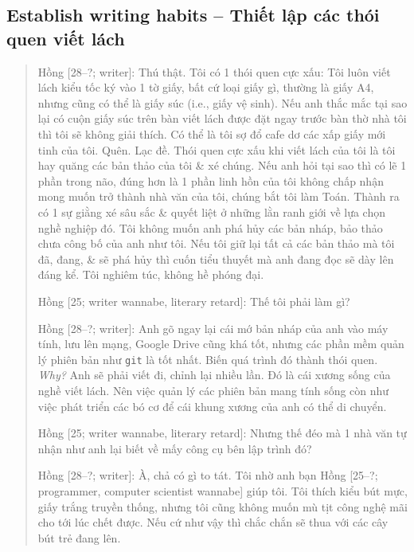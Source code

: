 \documentclass[12pt,twoside]{book}
\begin{document}
\subsection{Establish writing habits -- Thiết lập các thói quen viết lách}

\begin{quote}
	{\sf Hồng [28--?; writer]}: Thú thật. Tôi có 1 thói quen cực xấu: Tôi luôn viết lách kiểu tốc ký vào 1 tờ giấy, bất cứ loại giấy gì, thường là giấy A4, nhưng cũng có thể là giấy súc (i.e., giấy vệ sinh). Nếu anh thắc mắc tại sao lại có cuộn giấy súc trên bàn viết lách được đặt ngay trước bàn thờ nhà tôi thì tôi sẽ không giải thích. Có thể là tôi sợ đổ cafe dơ các xấp giấy mới tinh của tôi. Quên. Lạc đề. Thói quen cực xấu khi viết lách của tôi là tôi hay quăng các bản thảo của tôi \& xé chúng. Nếu anh hỏi tại sao thì có lẽ 1 phần trong não, đúng hơn là 1 phần linh hồn của tôi không chấp nhận mong muốn trở thành nhà văn của tôi, chúng bắt tôi làm Toán. Thành ra có 1 sự giằng xé sâu sắc \& quyết liệt ở những lằn ranh giới về lựa chọn nghề nghiệp đó. Tôi không muốn anh phá hủy các bản nháp, bảo thảo chưa công bố của anh như tôi. Nếu tôi giữ lại tất cả các bản thảo mà tôi đã, đang, \& sẽ phá hủy thì cuốn tiểu thuyết mà anh đang đọc sẽ dày lên đáng kể. Tôi nghiêm túc, không hề phóng đại.
	
	{\sf Hồng [25; writer wannabe, literary retard]}: Thế tôi phải làm gì?
	
	{\sf Hồng [28--?; writer]}: Anh gõ ngay lại cái mớ bản nháp của anh vào máy tính, lưu lên mạng, Google Drive cũng khá tốt, nhưng các phần mềm quản lý phiên bản như {\tt git} là tốt nhất. Biến quá trình đó thành thói quen. {\it Why?} Anh sẽ phải viết đi, chỉnh lại nhiều lần. Đó là cái xương sống của nghề viết lách. Nên việc quản lý các phiên bản mang tính sống còn như việc phát triển các bó cơ để cái khung xương của anh có thể di chuyển.
	
	{\sf Hồng [25; writer wannabe, literary retard]}: Nhưng thế đéo mà 1 nhà văn tự nhận như anh lại biết về mấy công cụ bên lập trình đó?
	
	{\sf Hồng [28--?; writer]}: À, chả có gì to tát. Tôi nhờ anh bạn {\sf Hồng [25--?; programmer, computer scientist wannabe]} giúp tôi. Tôi thích kiểu bút mực, giấy trắng truyền thống, nhưng tôi cũng không muốn mù tịt công nghệ mãi cho tới lúc chết được. Nếu cứ như vậy thì chắc chắn sẽ thua với các cây bút trẻ đang lên.
\end{quote}
\end{document}
